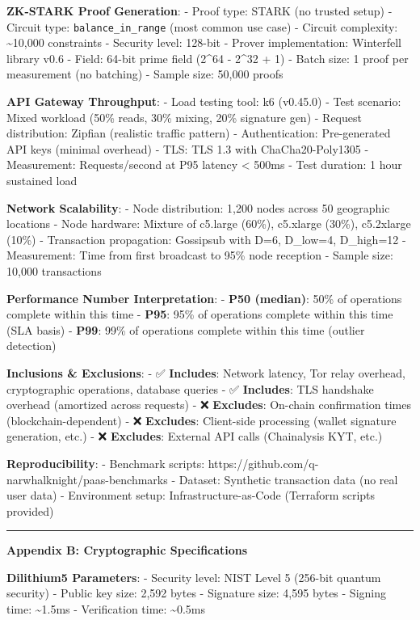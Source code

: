 \documentclass[
  11pt,
]{article}
\begin{document}
\textbf{ZK-STARK Proof Generation}: - Proof type: STARK (no trusted
setup) - Circuit type: \texttt{balance\_in\_range} (most common use
case) - Circuit complexity: \textasciitilde10,000 constraints - Security
level: 128-bit - Prover implementation: Winterfell library v0.6 - Field:
64-bit prime field (2\^{}64 - 2\^{}32 + 1) - Batch size: 1 proof per
measurement (no batching) - Sample size: 50,000 proofs

\textbf{API Gateway Throughput}: - Load testing tool: k6 (v0.45.0) -
Test scenario: Mixed workload (50\% reads, 30\% mixing, 20\% signature
gen) - Request distribution: Zipfian (realistic traffic pattern) -
Authentication: Pre-generated API keys (minimal overhead) - TLS: TLS 1.3
with ChaCha20-Poly1305 - Measurement: Requests/second at P95 latency
\textless{} 500ms - Test duration: 1 hour sustained load

\textbf{Network Scalability}: - Node distribution: 1,200 nodes across 50
geographic locations - Node hardware: Mixture of c5.large (60\%),
c5.xlarge (30\%), c5.2xlarge (10\%) - Transaction propagation: Gossipsub
with D=6, D\_low=4, D\_high=12 - Measurement: Time from first broadcast
to 95\% node reception - Sample size: 10,000 transactions

\textbf{Performance Number Interpretation}: - \textbf{P50 (median)}:
50\% of operations complete within this time - \textbf{P95}: 95\% of
operations complete within this time (SLA basis) - \textbf{P99}: 99\% of
operations complete within this time (outlier detection)

\textbf{Inclusions \& Exclusions}: - ✅ \textbf{Includes}: Network
latency, Tor relay overhead, cryptographic operations, database queries
- ✅ \textbf{Includes}: TLS handshake overhead (amortized across
requests) - ❌ \textbf{Excludes}: On-chain confirmation times
(blockchain-dependent) - ❌ \textbf{Excludes}: Client-side processing
(wallet signature generation, etc.) - ❌ \textbf{Excludes}: External API
calls (Chainalysis KYT, etc.)

\textbf{Reproducibility}: - Benchmark scripts:
https://github.com/q-narwhalknight/paas-benchmarks - Dataset: Synthetic
transaction data (no real user data) - Environment setup:
Infrastructure-as-Code (Terraform scripts provided)

\begin{center}\rule{0.5\linewidth}{0.5pt}\end{center}

\textbf{Appendix B: Cryptographic Specifications}

\textbf{Dilithium5 Parameters}: - Security level: NIST Level 5 (256-bit
quantum security) - Public key size: 2,592 bytes - Signature size: 4,595
bytes - Signing time: \textasciitilde1.5ms - Verification time:
\textasciitilde0.5ms
\end{document}
